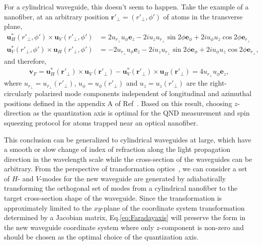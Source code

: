 \documentclass[aps,pra,twocolumn,superscriptaddress]{revtex4-1} %
\def\br{\mathbf{r}}
\begin{document}
For a cylindrical waveguide, this doesn't seem to happen.
Take the example of a nanofiber, at an arbitrary position $ \br'\!_\perp=(r'\!_\perp,\phi') $ of atoms in the transverse plane,
\begin{align}
\mathbf{u}_H^*(r'\!_\perp,\phi')\times \mathbf{u}_V(r'\!_\perp,\phi') &= 2u_{r\!_\perp} u_\phi\mathbf{e}_z - 2iu_zu_{r\!_\perp}\sin2\phi \mathbf{e}_\phi + 2iu_\phi u_z\cos2\phi \mathbf{e}_{r\!_\perp} \\
\mathbf{u}_V^*(r'\!_\perp,\phi')\times \mathbf{u}_H(r'\!_\perp,\phi') &= -2u_{r\!_\perp} u_\phi\mathbf{e}_z - 2iu_zu_{r\!_\perp}\sin2\phi \mathbf{e}_\phi + 2iu_\phi u_z\cos2\phi \mathbf{e}_{r\!_\perp},
\end{align}
and therefore,
\begin{align}\label{eq:Faradayaxis}
\mathbf{v}_F=\mathbf{u}_H^*(\br'\!_\perp)\!\times\!\mathbf{u}_{V}(\br'\!_\perp)\!-\!\mathbf{u}_V^*(\br'\!_\perp)\!\times\!\mathbf{u}_{H}(\br'\!_\perp) = 4u_{r\!_\perp} u_\phi\mathbf{e}_z,
\end{align}
where $ u_{r\!_\perp}=u_{r\!_\perp}(r'\!_\perp) $, $ u_\phi=u_\phi(r'\!_\perp) $ and $ u_z=u_z(r'\!_\perp) $ are the right-circularly polarized mode components independent of longitudinal and azimuthal positions defined in the appendix A of Ref~\cite{Qi2016}.
Based on this result, choosing $ z $-direction as the quantization axis is optimal for the QND measurement and spin squeezing protocol for atoms trapped near an optical nanofiber.

This conclusion can be generalized to cylindrical waveguides at large, which have a smooth or slow change of index of refraction along the light propagation direction in the wavelength scale while the cross-section of the waveguides can be arbitrary.
From the perspective of transformation optics~\cite{Leonhardt2006Optical,Kundtz2011Electromagnetic}, we can consider a set of $H$- and $V$-modes for the new waveguide are generated by adiabatically transforming the orthogonal set of modes from a cylindrical nanofiber to the target cross-section shape of the waveguide.
Since the transformation is approximately limited to the $xy$-plane of the coordinate system transformation determined by a Jacobian matrix, Eq.\eqref{eq:Faradayaxis} will preserve the form in the new waveguide coordinate system where only $ z $-component is non-zero and should be chosen as the optimal choice of the quantization axis.
\end{document}
